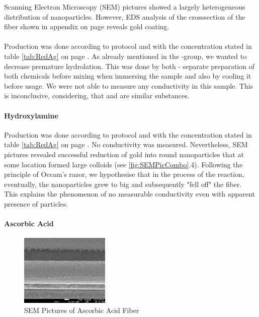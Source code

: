 Scanning Electron Microscopy (SEM) pictures showed a largely heterogeneous distribution of nanoparticles. However, EDS analysis of the crosssection of the fiber shown in appendix on page \pageref{SEMAppendix} reveals gold coating. 

\paragraph{}
Production was done according to protocol and with the concentration stated in table \ref{tab:RedAg} on page \pageref{tab:RedAg}. As already mentioned in the -group, we wanted to decrease premature hydrolation. This was done by both - separate preparation of both chemicals before mixing when immersing the sample and also by cooling it before usage. We were not able to measure any conductivity in this sample. This is inconclusive, considering, that  and  are similar substances.


\paragraph{Hydroxylamine}
Production was done according to protocol and with the concentration stated in table \ref{tab:RedAg} on page \pageref{tab:RedAg}. No conductivity was measured. Nevertheless, SEM pictures revealed successful reduction of gold into round nanoparticles that at some location formed large colloids (see \ref{fig:SEMPicCombo}.4). Following the principle of Occam's razor, we hypothesise that in the process of the reaction, eventually, the nanoparticles grew to big and subsequently "fell off" the fiber. This explains the phenomenon of no measurable conductivity even with apparent presence of particles. \hfill \newpage


\paragraph{Ascorbic Acid}

\begin{figure}
	\begin{center}
		\includegraphics[width=0.38\textwidth]{./pic/AscAcid_1_3_10mum.png}
	\end{center}
	\caption{\label{AscAcidFibre} SEM Pictures of Ascorbic Acid Fiber}	
\end{figure}


